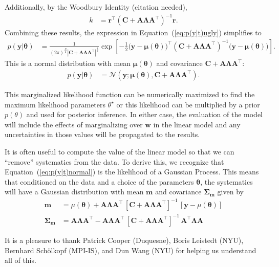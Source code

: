 \documentclass[modern]{rnaastex}
\renewcommand{\eqref}[1]{\ref{eq:#1}}
\newcommand{\Eq}[1]{Equation~(\eqref{#1})}
\newcommand{\eq}[1]{\Eq{#1}}
\newcommand{\eqlabel}[1]{\label{eq:#1}}
\newcommand{\citeme}{{\color{red}(citation needed)}}
\newcommand{\bvec}[1]{{\ensuremath{\boldsymbol{#1}}}}
\newcommand{\Normal}{\ensuremath{\mathcal{N}}}
\newcommand{\mA}{\ensuremath{\bvec{A}}}
\newcommand{\mC}{\ensuremath{\bvec{C}}}
\newcommand{\mL}{\ensuremath{\bvec{\Lambda}}}
\newcommand{\vy}{\ensuremath{\bvec{y}}}
\newcommand{\vt}{\ensuremath{\bvec{\theta}}}
\newcommand{\vm}{\ensuremath{\bvec{\mu}(\bvec{\theta})}}
\newcommand{\vre}{\ensuremath{\bvec{r}}}
\begin{document}
%
Additionally, by the Woodbury Identity \citeme,
%
\begin{align}
k &= \vre^\top \left( \mC + \mA \mL \mA^\top \right)^{-1} \vre.
\end{align}
%
Combining these results, the expression in \eq{p(y|t)ugly} simplifies to
\begin{align}
\eqlabel{p(y|t)exp}
p(\vy | \vt) &= \frac{1}{(2 \pi)^\frac{N}{2}
                |\mC + \mA \mL \mA^\top|^\frac{1}{2}}
                \exp \left[ -\frac{1}{2} \big( \vy - \vm \big)^\top
                            (\mC + \mA \mL \mA^\top)^{-1}
                            \big( \vy - \vm \big)
                     \right].
\end{align}
%
This is a normal distribution with mean $\vm$ and covariance
$\mC + \mA \mL \mA^\top$:
%
\begin{align}
\eqlabel{p(y|t)normal}
p(\vy | \vt) &= \Normal (\vy; \vm, \mC + \mA \mL \mA^\top).
\end{align}

This marginalized likelihood function can be numerically maximized to find the
maximum likelihood parameters $\theta^\star$ or this likelihood can be
multiplied by a prior $p(\theta)$ and used for posterior inference.
In either case, the evaluation of the model will include the effects of
marginalizing over $\bvec{w}$ in the linear model and any uncertainties in
those values will be propagated to the results.

It is often useful to compute the value of the linear model so that we can
``remove'' systematics from the data.
To derive this, we recognize that \eq{p(y|t)normal} is the likelihood of a
Gaussian Process.
This means that conditioned on the data and a choice of the parameters
$\bvec{\theta}$, the systematics will have a Gaussian distribution with mean
$\bvec{m}$ and covariance $\bvec{\Sigma}_\bvec{m}$ given by
\citep{Rasmussen:2006}
%
\begin{align}
\bvec{m} &= \mu(\bvec{\theta}) + \mA \mL \mA^\top\, \left[\mC + \mA \mL
    \mA^\top\right]^{-1}\,\left[\bvec{y} - \mu(\bvec{\theta})\right]
    \nonumber\\
\bvec{\Sigma}_\bvec{m} &= \mA \mL \mA^\top - \mA \mL \mA^\top\,
    \left[\mC + \mA \mL \mA^\top\right]^{-1} \,
    \mA^\top \mL \mA
\end{align}

\acknowledgements
It is a pleasure to thank
  Patrick Cooper (Duquesne),
  Boris Leistedt (NYU),
  Bernhard Sch\"olkopf (MPI-IS), and
  Dun Wang (NYU)
for helping us understand all of this.


\end{document}
